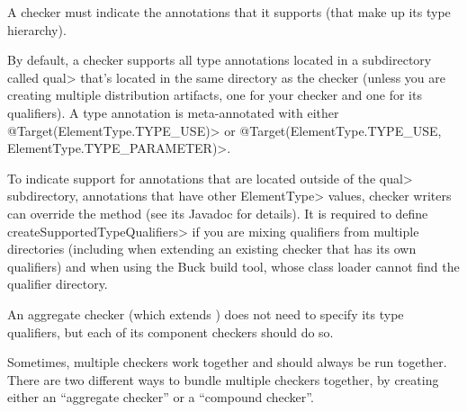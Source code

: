 
A checker must indicate the annotations that it supports (that make up its type
hierarchy).

By default, a checker supports all type annotations located in a
subdirectory called \<qual> that's located in the same directory as the
checker (unless you are creating multiple distribution artifacts, one for your
checker and one for its qualifiers).
A type annotation is meta-annotated with either
\<@Target(ElementType.TYPE\_USE)>
or
\<@Target({ElementType.TYPE\_USE, ElementType.TYPE\_PARAMETER})>.

To indicate support for annotations that are located outside of the \<qual>
subdirectory, annotations that have other \<ElementType> values,
checker writers can override the
method (see its Javadoc for details).
It is required to define \<createSupportedTypeQualifiers> if you are mixing
qualifiers from multiple directories (including when extending an existing
checker that has its own qualifiers) and when using the Buck build tool,
whose class loader cannot find the qualifier directory.

An aggregate checker (which extends
) does not need to specify its
type qualifiers, but each of its component checkers should do so.



Sometimes, multiple checkers work together and should always be run
together.  There are two different ways to bundle multiple checkers
together, by creating either an ``aggregate checker'' or a ``compound checker''.


